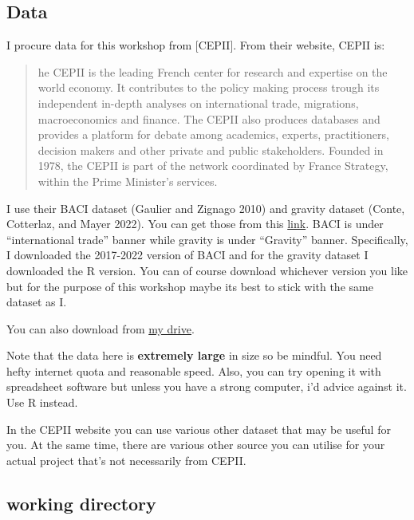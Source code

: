 \documentclass[
  a4paper,
  DIV=11,
  numbers=noendperiod]{scrreprt}
\begin{document}
\hypertarget{data}{%
\subsection{Data}\label{data}}

I procure data for this workshop from {[}CEPII{]}. From their website,
CEPII is:

\begin{quote}
he CEPII is the leading French center for research and expertise on the
world economy. It contributes to the policy making process trough its
independent in-depth analyses on international trade, migrations,
macroeconomics and finance. The CEPII also produces databases and
provides a platform for debate among academics, experts, practitioners,
decision makers and other private and public stakeholders. Founded in
1978, the CEPII is part of the network coordinated by France Strategy,
within the Prime Minister's services.
\end{quote}

I use their BACI dataset (Gaulier and Zignago 2010) and gravity dataset
(Conte, Cotterlaz, and Mayer 2022). You can get those from this
\href{http://www.cepii.fr/CEPII/en/bdd_modele/bdd_modele.asp}{link}.
BACI is under ``international trade'' banner while gravity is under
``Gravity'' banner. Specifically, I downloaded the 2017-2022 version of
BACI and for the gravity dataset I downloaded the R version. You can of
course download whichever version you like but for the purpose of this
workshop maybe its best to stick with the same dataset as I.

You can also download from
\href{https://1drv.ms/f/s!AjelszXKKcmskMsKLZRRwRJq1a2MnA?e=xsdpxL}{my
drive}.

Note that the data here is \textbf{extremely large} in size so be
mindful. You need hefty internet quota and reasonable speed. Also, you
can try opening it with spreadsheet software but unless you have a
strong computer, i'd advice against it. Use R instead.

In the CEPII website you can use various other dataset that may be
useful for you. At the same time, there are various other source you can
utilise for your actual project that's not necessarily from CEPII.

\hypertarget{working-directory}{%
\subsection{working directory}\label{working-directory}}
\end{document}
